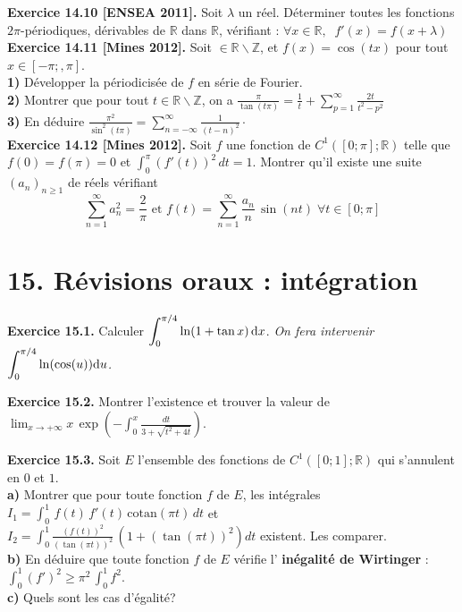 \documentclass[a4paper,12pt,francais]{article}
\newcommand{\field}[1]{\mathbb{#1}}
\newcommand{\Z}{\field{Z}}
\newcommand{\R}{\field{R}}
\begin{document}
\noindent
{\bf Exercice 14.10 [ENSEA 2011].} Soit $\lambda$ un réel. Déterminer toutes les fonctions $2\pi$-périodiques, dérivables de $\R$ dans $\R$, vérifiant :
\indent $\forall x\in \R,\; \; f'(x)=f(x+\lambda)$\\

\noindent
{\bf Exercice 14.11 [Mines 2012].}  Soit $\in \R \backslash \Z$, et $f(x)=\cos (tx)$ pour tout $x \in [-\pi;,\pi]$.\\
{\bf 1)} Développer la périodicisée de $f$ en série de Fourier.\\
{\bf 2)} Montrer que pour tout $t \in \R \backslash \Z$, on a $\displaystyle \frac{\pi}{\tan(t\pi)}=\frac{1}{t}+\sum_{p=1}^\infty \frac{2t}{t^2-p^2}$\\
{\bf 3)} En déduire $\displaystyle \frac{\pi^2}{\sin^2(t\pi)}=\sum_{n=-\infty}^\infty \frac{1}{(t-n)^2}\cdot$\\

\noindent
{\bf Exercice 14.12 [Mines 2012].} Soit $f$ une fonction de $C^1([0;\pi];\R)$ telle que $f(0)=f(\pi)=0$ et $\displaystyle  \int_0^\pi (f'(t))^2\, dt=1$. Montrer qu'il existe une suite $(a_n)_{n\geqslant 1}$ de réels vérifiant 
$$\sum_{n=1}^\infty a_n^2=\frac{2}{\pi} \mbox{ et } f(t)=\sum_{n=1}^\infty \frac{a_n}{n}\, \sin(nt) \; \forall t \in [0;\pi]$$

\newpage
\section*{15. Révisions oraux : intégration} %

\noindent
{\bf Exercice 15.1.} Calculer $\displaystyle \int_0^{\pi/4} \ln(1+\tan
x)\, {\rm d}x$. {\it On fera intervenir $\displaystyle \int_{0}^{\pi/4} \ln (\cos(u)) {\rm d}u$.} \\
\vspace{0.1cm}

\noindent
{\bf Exercice 15.2.} Montrer l'existence et trouver la valeur de 
$\displaystyle \lim_{x\rightarrow +\infty} x \, \exp \left({
-\int_0^x \frac{dt}{3+\sqrt{t^2+4t}}
}\right)$.\\
\vspace{0.3cm}

\noindent
{\bf Exercice 15.3.} Soit $E$ l'ensemble des fonctions de $C^1([0;1];\R)$
qui s'annulent en $0$ et $1$.\\
{\bf a)} Montrer que pour toute fonction $f$ de $E$, les intégrales
$I_1=\int_0^1 \,  f(t) \, f'(t) \, \mbox{cotan} (\pi t) \, dt$ et \\
$\displaystyle I_2=\int_0^1
\frac{(f(t))^2 }{(\tan(\pi t))^2 }\,(1+(\tan(\pi t))^2) dt$
existent. Les comparer.\\
{\bf b)} En déduire que toute fonction $f$ de $E$ vérifie l'{\bf
  inégalité de Wirtinger} :  
$\displaystyle \int_0^1 (f')^2 \geqslant \pi^2 \, \int_0^1 f^2.$\\
{\bf c)} Quels sont les cas d'égalité?\\
\end{document}
